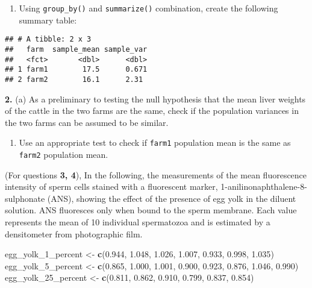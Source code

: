 \documentclass[]{article}
\newenvironment{Shaded}{\begin{snugshade}}{\end{snugshade}}
\newcommand{\KeywordTok}[1]{\textcolor[rgb]{0.13,0.29,0.53}{\textbf{#1}}}
\newcommand{\FloatTok}[1]{\textcolor[rgb]{0.00,0.00,0.81}{#1}}
\newcommand{\StringTok}[1]{\textcolor[rgb]{0.31,0.60,0.02}{#1}}
\newcommand{\NormalTok}[1]{#1}
\providecommand{\tightlist}{%
  \setlength{\itemsep}{0pt}\setlength{\parskip}{0pt}}
\begin{document}
\begin{enumerate}
\def\labelenumi{(\alph{enumi})}
\setcounter{enumi}{1}
\tightlist
\item
  Using \texttt{group\_by()} and \texttt{summarize()} combination,
  create the following summary table:
\end{enumerate}

\begin{verbatim}
## # A tibble: 2 x 3
##   farm  sample_mean sample_var
##   <fct>       <dbl>      <dbl>
## 1 farm1        17.5      0.671
## 2 farm2        16.1      2.31
\end{verbatim}

\textbf{2.} (a) As a preliminary to testing the null hypothesis that the
mean liver weights of the cattle in the two farms are the same, check if
the population variances in the two farms can be assumed to be similar.

\begin{enumerate}
\def\labelenumi{(\alph{enumi})}
\setcounter{enumi}{1}
\tightlist
\item
  Use an appropriate test to check if \texttt{farm1} population mean is
  the same as \texttt{farm2} population mean.
\end{enumerate}

(For questions \textbf{3, 4}), In the following, the measurements of the
mean fluorescence intensity of sperm cells stained with a fluorescent
marker, 1-anilinonaphthalene-8-sulphonate (ANS), showing the effect of
the presence of egg yolk in the diluent solution. ANS fluoresces only
when bound to the sperm membrane. Each value represents the mean of 10
individual spermatozoa and is estimated by a densitometer from
photographic film.

\begin{Shaded}
\begin{Highlighting}[]
\NormalTok{egg_yolk_1_percent <-}\StringTok{ }\KeywordTok{c}\NormalTok{(}\FloatTok{0.944}\NormalTok{, }\FloatTok{1.048}\NormalTok{, }\FloatTok{1.026}\NormalTok{, }\FloatTok{1.007}\NormalTok{, }\FloatTok{0.933}\NormalTok{, }\FloatTok{0.998}\NormalTok{, }\FloatTok{1.035}\NormalTok{)}
\NormalTok{egg_yolk_5_percent <-}\StringTok{ }\KeywordTok{c}\NormalTok{(}\FloatTok{0.865}\NormalTok{, }\FloatTok{1.000}\NormalTok{, }\FloatTok{1.001}\NormalTok{, }\FloatTok{0.900}\NormalTok{, }\FloatTok{0.923}\NormalTok{, }\FloatTok{0.876}\NormalTok{, }\FloatTok{1.046}\NormalTok{, }\FloatTok{0.990}\NormalTok{)}
\NormalTok{egg_yolk_25_percent <-}\StringTok{ }\KeywordTok{c}\NormalTok{(}\FloatTok{0.811}\NormalTok{, }\FloatTok{0.862}\NormalTok{, }\FloatTok{0.910}\NormalTok{, }\FloatTok{0.799}\NormalTok{, }\FloatTok{0.837}\NormalTok{, }\FloatTok{0.854}\NormalTok{)}
\end{Highlighting}
\end{Shaded}
\end{document}
